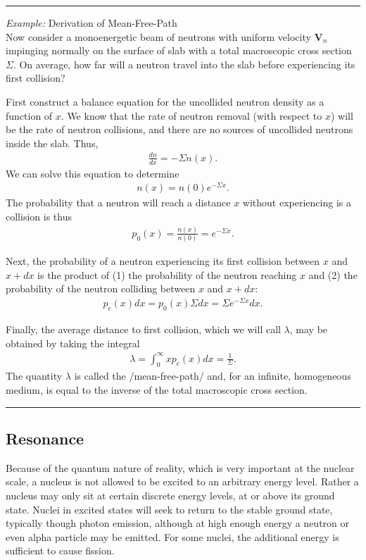 \documentclass[11pt]{article}
\renewcommand\vec{\mathbf}
\newenvironment{example}[1]{\vspace{0.2in}\hrule\vspace{0.1in}\noindent\emph{Example:} #1 \\}{\vspace{0.1in}\hrule\vspace{0.2in}}
\begin{document}
\begin{example}{Derivation of Mean-Free-Path}
Now consider a monoenergetic beam of neutrons with uniform velocity $\vec{V}_n$ impinging normally on the surface of slab with a total macroscopic cross section $\Sigma$.  On average, how far will a neutron travel into the slab before experiencing its first collision?

First construct a balance equation for the uncollided neutron density as a function of $x$.  We know that the rate of neutron removal (with respect to $x$) will be the rate of neutron collisions, and there are no sources of uncollided neutrons inside the slab.  Thus,
\begin{align}
  \frac{dn}{dx} = -\Sigma n(x).
\end{align}
We can solve this equation to determine
\begin{align}
  n(x) = n(0) e^{-\Sigma x}.
\end{align}
The probability that a neutron will reach a distance $x$ without experiencing is a collision is thus
\begin{align}
  p_0(x) = \frac{n(x)}{n(0)} = e^{-\Sigma x}.
\end{align}

Next, the probability of a neutron experiencing its first collision between $x$ and $x+dx$ is the product of (1) the probability of the neutron reaching $x$ and (2) the probability of the neutron colliding between $x$ and $x+dx$:
\begin{align}
  p_c(x)dx = p_0(x) \Sigma dx = \Sigma e^{-\Sigma x} dx.
\end{align}

Finally, the average distance to first collision, which we will call $\lambda$, may be obtained by taking the integral
\begin{align}
  \lambda = \int_0^\infty x p_c(x) dx = \frac{1}{\Sigma}.
\end{align}
The quantity $\lambda$ is called the /mean-free-path/ and, for an infinite, homogeneous medium, is equal to the inverse of the total macroscopic cross section.
\end{example}

\subsection{Resonance}
\label{sec:orgheadline18}
Because of the quantum nature of reality, which is very important at the nuclear scale, a nucleus is not allowed to be excited to an arbitrary energy level.  Rather a nucleus may only sit at certain discrete energy levels, at or above its ground state.  Nuclei in excited states will seek to return to the stable ground state, typically though photon emission, although at high enough energy a neutron or even alpha particle may be emitted.  For some nuclei, the additional energy is sufficient to cause fission.  
\end{document}
